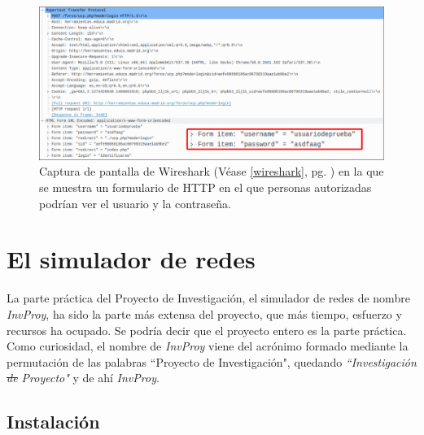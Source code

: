 \documentclass[a4paper, 11pt]{report} %
\begin{document}
\begin{figure}[H]
\noindent
\includegraphics[width=\textwidth]{Resources/Wireshark03.png}
\caption[Wireshark: HTTP Form sin encriptación]{Captura de pantalla de Wireshark (Véase \ref{wireshark}, pg. \pageref{wireshark}) en la que se muestra un formulario de HTTP en el que personas autorizadas podrían ver el usuario y la contraseña.}
\end{figure}


\newcommand{\function}[1]{\texttt{\color{Orange}#1}}
\newcommand{\class}[1]{\texttt{\color{DarkRed}#1}}
\chapter{El simulador de redes}
La parte práctica del Proyecto de Investigación, el simulador de redes de nombre \textit{InvProy}, ha sido la parte más extensa del proyecto, que más tiempo, esfuerzo y recursos ha ocupado. Se podría decir que el proyecto entero es la parte práctica. Como curiosidad, el nombre de \textit{InvProy} viene del acrónimo formado mediante la permutación de las palabras ``Proyecto de Investigación", quedando \textit{``Investigación \sout{de} Proyecto"} y de ahí \textit{InvProy}.

\section{Instalación}
\end{document}
